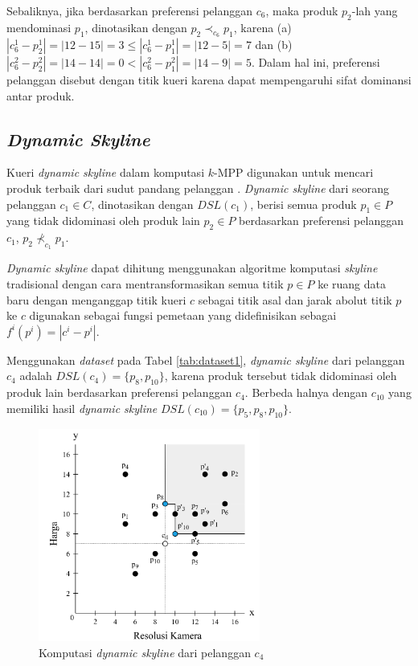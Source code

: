\documentclass[conference]{IEEEtran}
\begin{document}
Sebaliknya, jika berdasarkan preferensi pelanggan $c_6$, maka produk $p_2$-lah yang mendominasi $p_1$, dinotasikan dengan $p_2 \prec_{c_6} p_1$, karena (a) $|c_6^1 - p_2^1| = |12-15| = 3 \leq |c_6^1 - p_1^1| = |12-5| = 7$ dan (b) $|c_6^2 - p_2^2| = |14-14| = 0 < |c_6^2 - p_1^2| = |14-9| = 5$. Dalam hal ini, preferensi pelanggan disebut dengan titik kueri karena dapat mempengaruhi sifat dominansi antar produk.

\subsection{\textit{Dynamic Skyline}}
Kueri \textit{dynamic skyline} dalam komputasi $k$-MPP digunakan untuk mencari produk terbaik dari sudut pandang pelanggan \cite{kmpp}. \textit{Dynamic skyline} \cite{dynamic-skyline} dari seorang pelanggan $c_1 \in C$, dinotasikan dengan $DSL(c_1)$, berisi semua produk $p_1 \in P$ yang tidak didominasi oleh produk lain $p_2 \in P$ berdasarkan preferensi pelanggan $c_1$, $p_2 \nprec_{c_1} p_1$.

\textit{Dynamic skyline} dapat dihitung menggunakan algoritme komputasi \textit{skyline} tradisional \cite{skyline} dengan cara mentransformasikan semua titik $p \in P$ ke ruang data baru dengan menganggap titik kueri $c$ sebagai titik asal dan jarak abolut titik $p$ ke $c$ digunakan sebagai fungsi pemetaan yang didefinisikan sebagai $f^i (p^i) = |c^i-p^i|$.

Menggunakan \textit{dataset} pada Tabel \ref{tab:dataset1}, \textit{dynamic skyline} dari pelanggan $c_4$ adalah $DSL(c_4) = \{p_8, p_{10}\}$, karena produk tersebut tidak didominasi oleh produk lain berdasarkan preferensi pelanggan $c_4$. Berbeda halnya dengan $c_{10}$ yang memiliki hasil \textit{dynamic skyline} $DSL(c_{10}) = \{p_5, p_8, p_{10}\}$. 

\begin{figure}[htbp]
	\centering
	\includegraphics[height=7cm]{img/bab2/dsl-1.png}
	\caption{Komputasi \textit{dynamic skyline} dari pelanggan $c_{4}$}
	\label{fig:dsl-1}
\end{figure}
\end{document}
